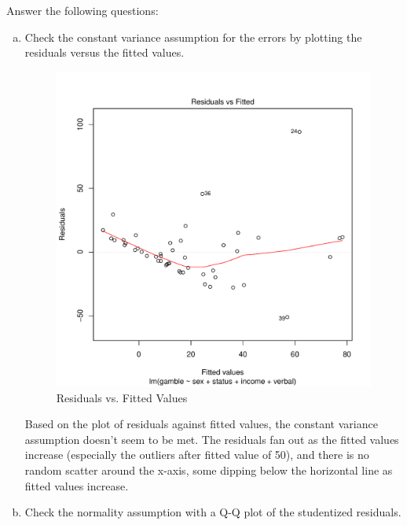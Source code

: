 \documentclass[12pt,letterpaper]{article}
\begin{document}
\vspace{.5cm}
  
\newpage
Answer the following questions:
\vspace{.5cm}
\begin{enumerate}[(a)]
	 \item Check the constant variance assumption for the errors by plotting the residuals versus the fitted values.
	 
	 	\begin{figure} [h]
	 	\centering
	 	\includegraphics[width=0.7\linewidth]{plot1.pdf}
	 	\caption{Residuals vs. Fitted Values}
	 	\label{fig:graph2}
	 \end{figure}
 	 
 		
 Based on the plot of residuals against fitted values, the constant variance assumption doesn't seem to be met. The residuals fan out as the fitted values increase (especially the outliers after fitted value of 50), and there is no random scatter around the x-axis, some dipping below the horizontal line as fitted values increase.
 	
 	\newpage
	\item Check the normality assumption with a Q-Q plot of the studentized residuals.
	

\end{enumerate}
\end{document}
